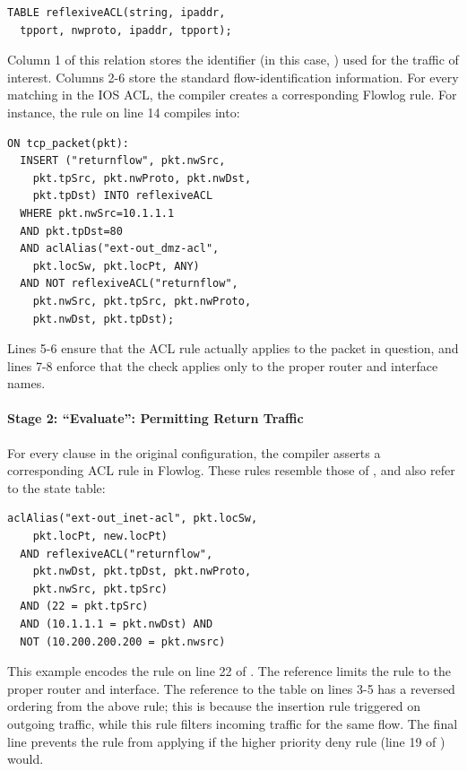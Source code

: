 \begin{lstlisting}[label=lst:flowlog-racl-table,language=Flowlog]
TABLE reflexiveACL(string, ipaddr, 
  tpport, nwproto, ipaddr, tpport);
\end{lstlisting}

Column 1 of this relation stores the identifier (in this case, )
used for the traffic of interest. Columns 2-6 store the standard
flow-identification information. For every matching  in the IOS
ACL, the compiler creates a corresponding Flowlog 
rule. For instance, the rule on line 14 compiles into:

\begin{lstlisting}[label=lst:flowlog-racl-insert,language=Flowlog]
ON tcp_packet(pkt):
  INSERT ("returnflow", pkt.nwSrc, 
    pkt.tpSrc, pkt.nwProto, pkt.nwDst,
    pkt.tpDst) INTO reflexiveACL
  WHERE pkt.nwSrc=10.1.1.1 
  AND pkt.tpDst=80
  AND aclAlias("ext-out_dmz-acl", 
    pkt.locSw, pkt.locPt, ANY) 
  AND NOT reflexiveACL("returnflow", 
    pkt.nwSrc, pkt.tpSrc, pkt.nwProto, 
    pkt.nwDst, pkt.tpDst);
\end{lstlisting}
Lines 5-6 ensure that the ACL rule actually applies to the packet in
question, and lines 7-8 enforce that the check applies only to the
proper router and interface names. 

\paragraph{Stage 2: ``Evaluate'': Permitting Return Traffic}

For every  clause in the original configuration, the compiler asserts a
corresponding ACL rule in Flowlog. These rules resemble those of ,
and also refer to the  state table:

\noindent %
\begin{minipage}{\linewidth}
\begin{lstlisting}[label=lst:flowlog-racl-rule,language=Flowlog]
  aclAlias("ext-out_inet-acl", pkt.locSw, 
    pkt.locPt, new.locPt)  
  AND reflexiveACL("returnflow", 
    pkt.nwDst, pkt.tpDst, pkt.nwProto, 
    pkt.nwSrc, pkt.tpSrc) 
  AND (22 = pkt.tpSrc) 
  AND (10.1.1.1 = pkt.nwDst) AND 
  NOT (10.200.200.200 = pkt.nwsrc)
\end{lstlisting}
\end{minipage}

\noindent
This example encodes the  rule on line 22 of
. The  reference
limits the rule to the proper router and interface. The
reference to the  table on lines 3-5 has a reversed
ordering from the above  rule;
this is because the insertion rule triggered on outgoing traffic, while
this rule filters incoming traffic for the same flow. The final line
prevents the rule from applying if the higher priority deny rule
(line 19 of ) would.

